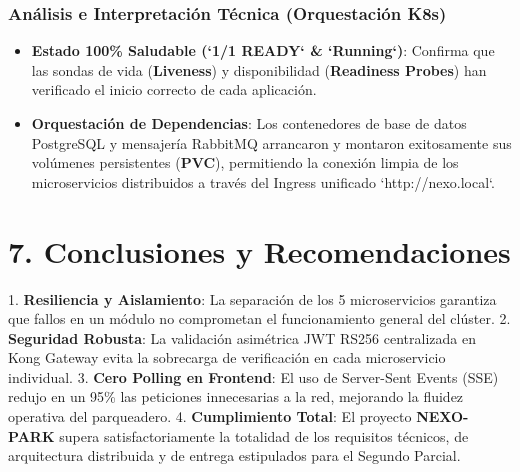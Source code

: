\documentclass[11pt,a4paper]{article}
\begin{document}
\subsubsection{Análisis e Interpretación Técnica (Orquestación K8s)}
\begin{itemize}[leftmargin=*]
    \item \textbf{Estado 100\% Saludable (`1/1 READY` \& `Running`)}: Confirma que las sondas de vida (\textbf{Liveness}) y disponibilidad (\textbf{Readiness Probes}) han verificado el inicio correcto de cada aplicación.
    \item \textbf{Orquestación de Dependencias}: Los contenedores de base de datos PostgreSQL y mensajería RabbitMQ arrancaron y montaron exitosamente sus volúmenes persistentes (\textbf{PVC}), permitiendo la conexión limpia de los microservicios distribuidos a través del Ingress unificado `http://nexo.local`.
\end{itemize}

\section{7. Conclusiones y Recomendaciones}

1. \textbf{Resiliencia y Aislamiento}: La separación de los 5 microservicios garantiza que fallos en un módulo no comprometan el funcionamiento general del clúster.
2. \textbf{Seguridad Robusta}: La validación asimétrica JWT RS256 centralizada en Kong Gateway evita la sobrecarga de verificación en cada microservicio individual.
3. \textbf{Cero Polling en Frontend}: El uso de Server-Sent Events (SSE) redujo en un 95\% las peticiones innecesarias a la red, mejorando la fluidez operativa del parqueadero.
4. \textbf{Cumplimiento Total}: El proyecto \textbf{NEXO-PARK} supera satisfactoriamente la totalidad de los requisitos técnicos, de arquitectura distribuida y de entrega estipulados para el Segundo Parcial.
\end{document}

